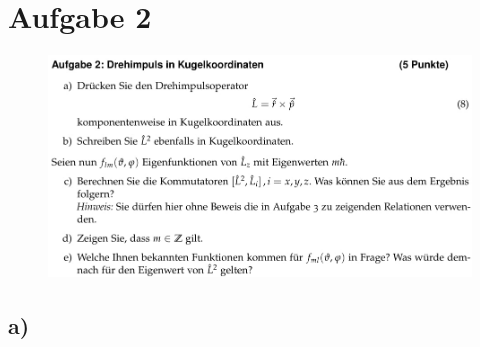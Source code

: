 \section{Aufgabe 2}

    \begin{figure}[H]
        \centering
        \includegraphics[width=\textwidth]{images/Aufgabe2.jpg}
        \label{fig:2}
    \end{figure}

    \subsection{a)}

